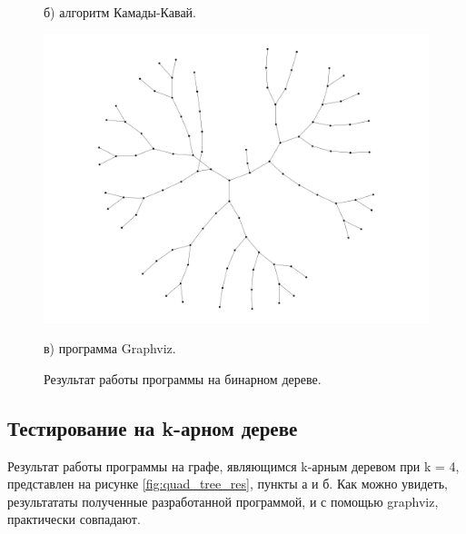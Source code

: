 \documentclass[14pt, russian]{scrartcl}
\begin{document}
\begin{figure}[H]
\begin{minipage}[t]{.56\linewidth}
		\caption*{б) алгоритм Камады-Кавай.}
	\end{minipage}
	\begin{minipage}[t]{.55\textwidth}
		\centering
		\includegraphics[width=\linewidth]{./imgs/bin_tree_gv.png}
		\caption*{в) программа Graphviz.}
	\end{minipage}
	\caption{Результат работы программы на бинарном дереве.}
	\label{fig:bin_tree_res}
\end{figure}

\subsection{Тестирование на k-арном дереве}

Результат работы программы на графе, являющимся k-арным деревом при k = 4, представлен на рисунке \ref{fig:quad_tree_res}, пункты а и б. Как можно увидеть, результататы полученные разработанной программой, и с помощью graphviz, практически совпадают.
\end{document}
